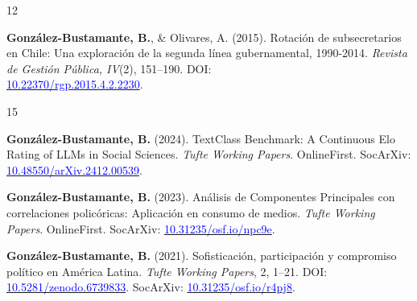\begin{publications}
\begin{benumerate}{12}
\item{{\bfseries González-Bustamante, B.}, \& Olivares, A. (2015). Rotación de subsecretarios en Chile: Una exploración de la segunda línea gubernamental, 1990-2014. {\itshape Revista de Gestión Pública, IV}(2), 151--190. DOI: \\ \href{https://doi.org/10.22370/rgp.2015.4.2.2230}{\textcolor{blue}{10.22370/rgp.2015.4.2.2230}}.} \vspace{1mm}

\end{benumerate}

\end{publications}


\begin{publications}

\begin{benumerate}{15}

\item{{\bfseries González-Bustamante, B.} (2024). TextClass Benchmark: A Continuous Elo Rating of LLMs in Social Sciences. {\itshape Tufte Working Papers}. OnlineFirst. SocArXiv: \href{https://doi.org/10.48550/arXiv.2412.00539}{\textcolor{blue}{10.48550/arXiv.2412.00539}}.}\vspace{1mm}

\item{{\bfseries González-Bustamante, B.} (2023). Análisis de Componentes Principales con correlaciones policóricas: Aplicación en consumo de medios. {\itshape Tufte Working Papers}. OnlineFirst. SocArXiv: \href{https://doi.org/10.31235/osf.io/npc9e}{\textcolor{blue}{10.31235/osf.io/npc9e}}.}\vspace{1mm}


\item{{\bfseries González-Bustamante, B.} (2021). Sofisticación, participación y compromiso político en América Latina. {\itshape Tufte Working Papers}, 2, 1--21. DOI: \href{https://doi.org/10.5281/zenodo.6739833}{\textcolor{blue}{10.5281/zenodo.6739833}}. SocArXiv: \href{https://doi.org/10.31235/osf.io/r4pj8}{\textcolor{blue}{10.31235/osf.io/r4pj8}}.}\vspace{1mm}


\end{benumerate}
\end{publications}
